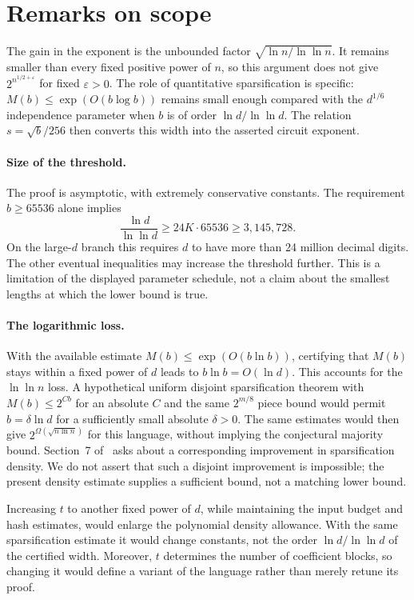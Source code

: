 \documentclass[11pt,letterpaper]{article}
\theoremstyle{definition}
\numberwithin{equation}{section}
\begin{document}
\section{Remarks on scope}
The gain in the exponent is the unbounded factor
$\sqrt{\ln n/\ln\ln n}$. It remains smaller than every fixed positive
power of $n$, so this argument does not give $2^{n^{1/2+\varepsilon}}$ for
fixed $\varepsilon>0$. The role of quantitative sparsification is specific:
$M(b)\le\exp(O(b\log b))$ remains small enough compared with the
$d^{1/6}$ independence parameter when $b$ is of order $\ln d/\ln\ln d$.
The relation $s=\sqrt b/256$ then converts this width into the asserted
circuit exponent.

\paragraph{Size of the threshold.}
The proof is asymptotic, with extremely conservative constants. The
requirement $b\ge65536$ alone implies
\[
 \frac{\ln d}{\ln\ln d}\ge24K\cdot65536\ge3{,}145{,}728.
\]
On the large-$d$ branch this requires $d$ to have more than 24 million
decimal digits. The other eventual inequalities may increase the threshold
further. This is a limitation of the displayed parameter schedule, not a
claim about the smallest lengths at which the lower bound is true.

\paragraph{The logarithmic loss.}
With the available estimate $M(b)\le\exp(O(b\ln b))$, certifying that
$M(b)$ stays within a fixed power of $d$ leads to
$b\ln b=O(\ln d)$. This accounts for the $\ln\ln n$ loss. A hypothetical
uniform disjoint sparsification theorem with $M(b)\le2^{Cb}$ for an
absolute $C$ and the same $2^{m/8}$ piece bound would permit
$b=\delta\ln d$ for a sufficiently small absolute $\delta>0$.
The same estimates would then give $2^{\Omega(\sqrt{n\ln n})}$ for this
language, without implying the conjectural majority bound.
Section~7 of~\cite{CIP} asks about a corresponding improvement in
sparsification density. We do not assert that such a disjoint improvement
is impossible; the present density estimate supplies a sufficient bound,
not a matching lower bound.

Increasing $t$ to another fixed power of $d$, while maintaining the input
budget and hash estimates, would enlarge the polynomial density allowance.
With the same sparsification estimate it would change constants, not the
order $\ln d/\ln\ln d$ of the certified width. Moreover, $t$ determines the
number of coefficient blocks, so changing it would define a variant of
the language rather than merely retune its proof.
\end{document}
